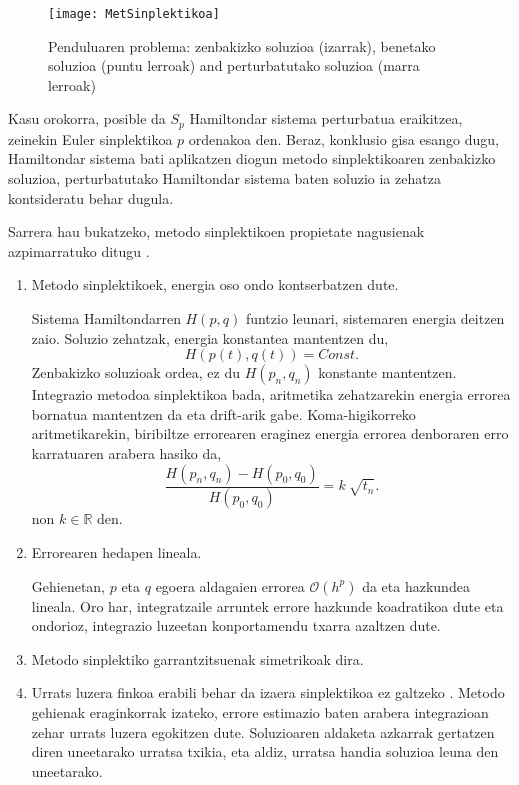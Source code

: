 \begin{figure}[h!]
\centering
\texttt{[image: MetSinplektikoa]}
\caption{ \small Penduluaren problema: zenbakizko soluzioa (izarrak), benetako soluzioa (puntu lerroak) and perturbatutako soluzioa (marra lerroak) \cite{SSerna2015b}}
\label{fig:MetSinplektikoa}
\end{figure}

Kasu orokorra, posible da $S_p$ Hamiltondar sistema perturbatua eraikitzea, zeinekin Euler sinplektikoa $p$ ordenakoa den. Beraz, konklusio gisa esango dugu, Hamiltondar sistema bati aplikatzen diogun metodo sinplektikoaren zenbakizko soluzioa, perturbatutako Hamiltondar sistema baten soluzio ia zehatza kontsideratu behar dugula. 

Sarrera hau bukatzeko, metodo sinplektikoen propietate nagusienak azpimarratuko ditugu \cite{Hairer2006,JMSanz-Serna1994}.
\begin{enumerate}

\item Metodo sinplektikoek, energia oso ondo kontserbatzen dute.

Sistema Hamiltondarren $H(p,q)$ funtzio leunari, sistemaren energia deitzen zaio. Soluzio zehatzak, energia konstantea mantentzen du,
\begin{equation*}
H(p(t),q(t))=Const.
\end{equation*}
Zenbakizko soluzioak ordea, ez du $H(p_n,q_n)$  konstante mantentzen. Integrazio metodoa sinplektikoa bada, aritmetika zehatzarekin energia errorea bornatua mantentzen da eta drift-arik gabe. Koma-higikorreko aritmetikarekin, biribiltze errorearen eraginez energia errorea denboraren erro karratuaren arabera hasiko da,
\begin{equation*}
\frac{H(p_n,q_n)-H(p_0,q_0)}{H(p_0,q_0)}=k \ \sqrt{t_n}.
\end{equation*}
non $k\in \mathbb{R}$ den.

\item Errorearen hedapen lineala.

Gehienetan, $p$ eta $q$ egoera aldagaien errorea $\mathcal{O}(h^p)$ da eta hazkundea lineala. Oro har, integratzaile arruntek errore hazkunde koadratikoa dute eta ondorioz, integrazio luzeetan konportamendu txarra azaltzen dute.

\item Metodo sinplektiko garrantzitsuenak simetrikoak dira.

\item Urrats luzera finkoa erabili behar da izaera sinplektikoa ez galtzeko \cite{JMSanz-Serna1994}.  Metodo gehienak eraginkorrak izateko, errore estimazio baten arabera integrazioan zehar urrats luzera egokitzen dute. Soluzioaren aldaketa azkarrak gertatzen diren uneetarako urratsa txikia, eta aldiz, urratsa handia soluzioa leuna den uneetarako.   

\end{enumerate} 

